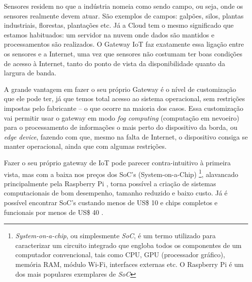Sensores residem no que a indústria nomeia como sendo campo, ou seja, onde os sensores realmente devem atuar. São exemplos de campos: galpões, silos, plantas industriais, florestas, plantações etc. Já a Cloud tem o mesmo significado que estamos habituados: um servidor na nuvem onde dados são mantidos e processamentos são realizados. O Gateway IoT faz exatamente essa ligação entre os sensores e a Internet, uma vez que sensores não costumam ter boas condições de acesso à Internet, tanto do ponto de vista da disponibilidade quanto da largura de banda.

A grande vantagem em fazer o seu próprio Gateway é o nível de customização que ele pode ter, já que temos total acesso ao sistema operacional, sem restrições impostas pelo fabricante – o que ocorre na maioria dos casos. Essa customização vai permitir usar o gateway em modo \textit{fog computing} (computação em nevoeiro) para o processamento de informações o mais perto do dispositivo da borda, ou \textit{edge device}, fazendo com que, mesmo na falta de Internet, o dispositivo consiga se manter operacional, ainda que com algumas restrições.

Fazer o seu próprio gateway de IoT pode parecer contra-intuitivo à primeira vista, mas com a baixa nos preços dos SoC’s (System-on-a-Chip) \footnote{\textit{System-on-a-chip}, ou simplesmente \textit{SoC}, é um termo utilizado para caracterizar um circuito integrado que engloba todos os componentes de um computador convencional, tais como CPU, GPU (processador gráfico), memória RAM, módulo Wi-Fi, interfaces externas etc. O Raspberry Pi é um dos mais populares exemplares de \textit{SoC}}, alavancado principalmente pela Raspberry Pi \cite{RaspberryPi}, torna possível a criação de sistemas computacionais de bom desempenho, tamanho reduzido e baixo custo. Já é possível encontrar SoC’s custando menos de US\$ 10 e chips completos e funcionais por menos de US\$ 40 \cite{RaspberryPiVenda}.